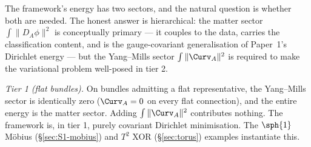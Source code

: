 \begin{remark}\label{rem:matter-vs-ymh}
The framework's energy has two sectors, and the natural question is
whether both are needed. The honest answer is hierarchical: the
matter sector $\int\|D_A\phi\|^2$ is conceptually primary --- it
couples to the data, carries the classification content, and is the
gauge-covariant generalisation of Paper~1's Dirichlet energy --- but
the Yang--Mills sector $\int\|\Curv_A\|^2$ is required to make the
variational problem well-posed in tier 2.

\emph{Tier 1 (flat bundles).} On bundles admitting a flat
representative, the Yang--Mills sector is identically zero
($\Curv_A=0$ on every flat connection), and the entire energy is
the matter sector. Adding $\int\|\Curv_A\|^2$ contributes nothing.
The framework is, in tier 1, purely covariant Dirichlet
minimisation. The $\sph{1}$ M\"obius (\S\ref{sec:S1-mobius}) and
$T^2$ XOR (\S\ref{sec:torus}) examples instantiate this.


\end{remark}
